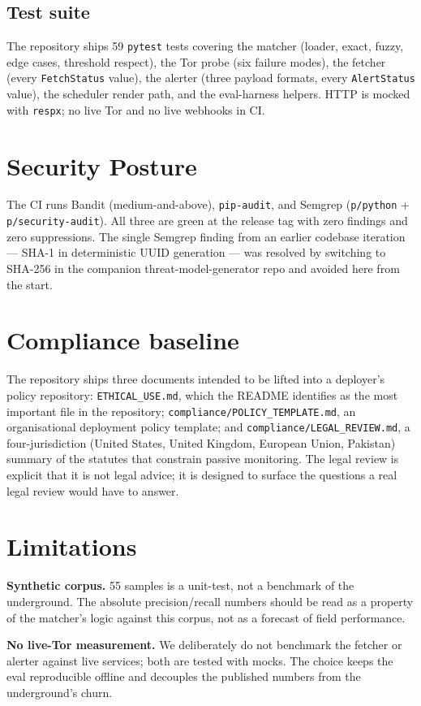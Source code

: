 \documentclass[conference]{IEEEtran}
\begin{document}
\subsection{Test suite}
The repository ships 59 \texttt{pytest} tests covering the matcher
(loader, exact, fuzzy, edge cases, threshold respect), the Tor
probe (six failure modes), the fetcher (every \texttt{FetchStatus}
value), the alerter (three payload formats, every
\texttt{AlertStatus} value), the scheduler render path, and the
eval-harness helpers. HTTP is mocked with \texttt{respx}; no live
Tor and no live webhooks in CI.

\section{Security Posture}
The CI runs Bandit (medium-and-above), \texttt{pip-audit}, and
Semgrep (\texttt{p/python} + \texttt{p/security-audit}). All three
are green at the release tag with zero findings and zero
suppressions. The single Semgrep finding from an earlier
codebase iteration --- SHA-1 in deterministic UUID generation ---
was resolved by switching to SHA-256 in the companion
threat-model-generator repo and avoided here from the start.

\section{Compliance baseline}
The repository ships three documents intended to be lifted into a
deployer's policy repository: \texttt{ETHICAL\_USE.md}, which the
README identifies as the most important file in the repository;
\texttt{compliance/POLICY\_TEMPLATE.md}, an organisational
deployment policy template; and
\texttt{compliance/LEGAL\_REVIEW.md}, a four-jurisdiction (United
States, United Kingdom, European Union, Pakistan) summary of the
statutes that constrain passive monitoring. The legal review is
explicit that it is not legal advice; it is designed to surface
the questions a real legal review would have to answer.

\section{Limitations}
\textbf{Synthetic corpus.} 55 samples is a unit-test, not a
benchmark of the underground. The absolute precision/recall numbers
should be read as a property of the matcher's logic against this
corpus, not as a forecast of field performance.

\textbf{No live-Tor measurement.} We deliberately do not benchmark
the fetcher or alerter against live services; both are tested with
mocks. The choice keeps the eval reproducible offline and
decouples the published numbers from the underground's churn.
\end{document}
